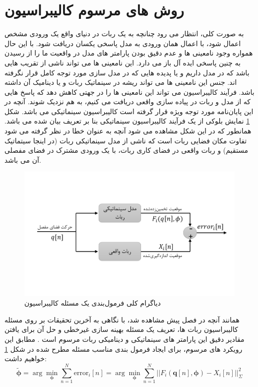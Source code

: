 \section{روش های مرسوم کالیبراسیون} \label{seq:conventional_calibration}
به صورت کلی، انتظار می رود چنانچه به یک ربات در دنیای واقع یک ورودی مشخص اعمال شود، با اعمال همان ورودی به مدل پاسخی یکسان دریافت شود. با این حال همواره وجود نامعینی ها و عدم دقیق بودن پارامتر های مدل در واقعیت ما را از رسیدن به چنین پاسخی ایده آل باز می دارد. این نامعینی ها می تواند ناشی از تقریب هایی باشد که در مدل داریم و یا پدیده هایی که در مدل سازی مورد توجه کامل قرار نگرفته اند. جنس این نامعینی ها می تواند ریشه در سینماتیک ربات و یا دینامیک آن داشته باشد. فرآیند کالیبراسیون می تواند این نامعینی ها را در جهتی کاهش دهد که پاسخ هایی که از مدل و ربات در پیاده سازی واقعی دریافت می کنیم، به هم نزدیک شوند. آنچه در این پایان‌نامه مورد توجه ویژه قرار گرفته است کالیبراسیون سینماتیکی می باشد. شکل \ref{fig:kinematicmodelerror} نمایش بلوکی از یک فرآیند کالیبراسیون سینماتیکی بنا بر تعریف بیان شده می باشد. همانطور که در این شکل مشاهده می شود آنچه به عنوان خطا در نظر گرفته می شود تفاوت مکان فضایی ربات است که ناشی از مدل سینماتیکی ربات (در اینجا سیتماتیک مستقیم) و ربات واقعی در فضای کاری ربات، با یک ورودی مشترک در فضای مفصلی آن می باشد. 

\begin{figure}[!t]
	\centering
	\includegraphics[width=0.8\linewidth, trim={0cm 2.2cm 0cm 2.2cm}, clip]{img/kinematic_model_error}
	\caption{دیاگرام کلی فرمول‌بندی یک مسئله کالیبراسیون}
	\label{fig:kinematicmodelerror}
\end{figure}


همانند آنچه در فصل پیش‌ مشاهده شد، با نگاهی به آخرین تحقیقات بر روی مسئله کالیبراسیون ربات ها، تعریف یک مسئله بهینه سازی غیرخطی و حل آن برای یافتن مقادیر دقیق این پارامتر های سینماتیکی و دینامیکی ربات مرسوم است
\cite{elatta2004overview,ida2019automatic,ida2022identification,ida2021dynamics}.
مطابق این رویکرد های مرسوم، برای ایجاد فرمول بندی مناسب مسئله مطرح شده در شکل \ref{fig:kinematicmodelerror} خواهیم داشت:
\begin{equation}\label{eq:optimization_equation_conventional}
	\tilde{\boldsymbol{\phi}} =  \arg\min_{\boldsymbol{\phi}} \sum_{n = 1 }^{N} \text{error}_i[n] = \arg\min_{\boldsymbol{\phi}} \sum_{n = 1}^{N} ||F_i(\boldsymbol{q}[n], \boldsymbol{\phi}) - X_i[n]||^2_{\Sigma}
\end{equation}

